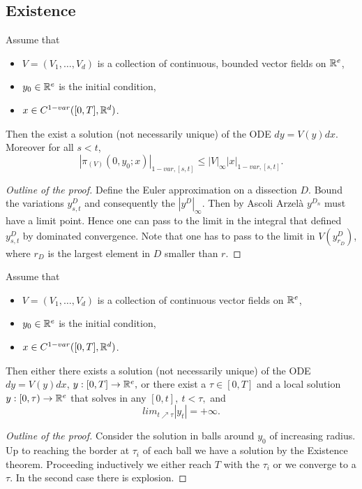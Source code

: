 \subsection{Existence}

\begin{theorem}[Existence]
    Assume that
    \begin{itemize}
        \item $V = (V_1, \ldots, V_d)$ is a collection of continuous, bounded vector fields on $\mathbb{R}^e$,
        \item $y_0 \in \mathbb{R}^e$ is the initial condition,
        \item $x \in C^{1-var}([0,T], \mathbb{R}^d)$.
    \end{itemize}
    Then the exist a solution (not necessarily unique) of the ODE $dy = V(y)dx$.
    Moreover for all $s < t$,
    \begin{equation}
        |\pi_{(V)}(0, y_0; x)|_{1-var, [s,t]} \leq |V|_\infty |x|_{1-var, [s,t]}.
    \end{equation}
\end{theorem}
\begin{proof}[Outline of the proof]
    Define the Euler approximation on a dissection $D$.
    Bound the variations $y^D_{s,t}$ and consequently the $|y^D|_\infty.$
    Then by Ascoli Arzelà $y^{D_n}$ must have a limit point.
    Hence one can pass to the limit in the integral that defined $y^D_{s,t}$ by dominated convergence.
    Note that one has to pass to the limit in $V(y_{r_D}^D)$, where $r_D$ is the largest element in $D$ smaller than $r.$
\end{proof}

\begin{theorem}
      Assume that
    \begin{itemize}
        \item $V = (V_1, \ldots, V_d)$ is a collection of continuous vector fields on $\mathbb{R}^e$,
        \item $y_0 \in \mathbb{R}^e$ is the initial condition,
        \item $x \in C^{1-var}([0,T], \mathbb{R}^d)$.
    \end{itemize}
    Then either there exists a solution (not necessarily unique) of the ODE $dy = V(y)dx$, $y:[0,T] \rightarrow \mathbb{R}^e,$
    or there exist a $\tau \in [0,T]$ and a local solution $y:[0,\tau) \rightarrow \mathbb{R}^e$ that solves in any $[0,t], \ t < \tau,$ and 
 \begin{equation}
    lim_{t \nearrow \tau} |y_t| = +\infty.
 \end{equation}
\end{theorem}
\begin{proof}[Outline of the proof]
    Consider the solution in balls around $y_0$ of increasing radius. Up to reaching the border at $\tau_i$ of each ball we have a solution by the Existence theorem.
    Proceeding inductively we either reach $T$ with the $\tau_i$ or we converge to a $\tau.$ In the second case there is explosion.
\end{proof}

